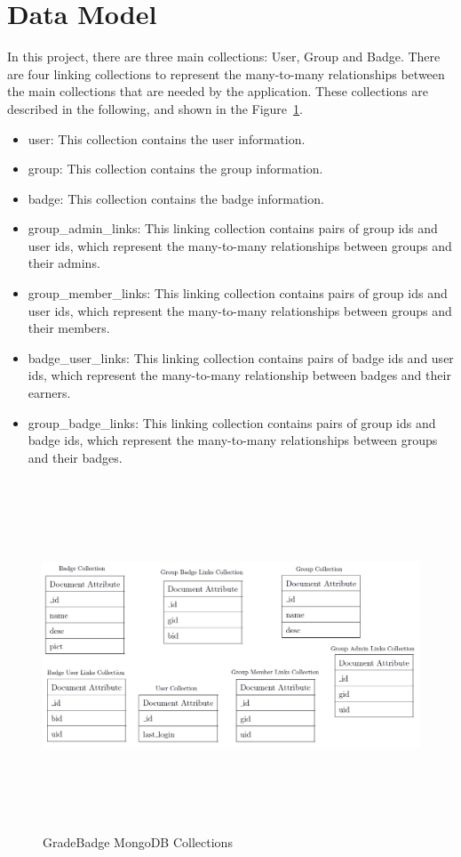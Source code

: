 \section{Data Model}
In this project, there are three main collections: User, Group and Badge.  There are four linking collections to represent the many-to-many relationships between the main collections that are needed by the application.  These collections are described in the following, and shown in the Figure~\ref{fig:db}. 

\begin{itemize}
\item user: This collection contains the user information.
\item group: This collection contains the group information.  
\item badge: This collection contains the badge information.
\item group{\_}admin{\_}links: This linking collection contains pairs of group ids and user ids, which represent the many-to-many relationships between groups and their admins.
\item group{\_}member{\_}links: This linking collection contains pairs of group ids and user ids, which represent the many-to-many relationships between groups and their members.
\item badge{\_}user{\_}links: This linking collection contains pairs of badge ids and user ids, which represent the many-to-many relationship between badges and their earners.
\item group{\_}badge{\_}links: This linking collection contains pairs of group ids and badge ids, which represent the many-to-many relationships between groups and their badges.
\end{itemize}

\vspace{3em}
\begin{figure}[H]
\begin{center}
\includegraphics[height=4.1in,width=5.5in]{images/ER.png}
\caption{GradeBadge MongoDB Collections }
\label{fig:db}
\end{center}
\end{figure}

